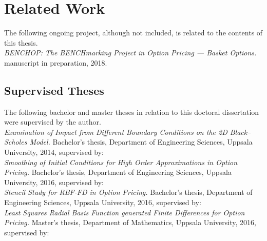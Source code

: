 \documentclass{UUThesisTemplate}
\begin{document}
    




%
\chapter*{Related Work}
    \noindent The following ongoing project, although not included, is related to the contents of this thesis.\\
    
	\noindent {} 
    	\emph{BENCHOP: The BENCHmarking Project in Option Pricing --- Basket Options.}  	  
    	manuscript in preparation, 2018. \label{paper7}	

\section*{Supervised Theses}
The following bachelor and master theses in relation to this doctoral dissertation were supervised by the author.\\
	
	\noindent {} 
    	\emph{Examination of Impact from Different Boundary Conditions on the 2D Black--Scholes Model.}  	  
    	Bachelor's thesis, Department of Engineering Sciences, Uppsala University, 2014,
	supervised by: \\
	
	\noindent {} 
    	\emph{Smoothing of Initial Conditions for High Order Approximations in Option Pricing.}  	  
    	Bachelor's thesis, Department of Engineering Sciences, Uppsala University, 2016,
	supervised by: \\
	
	\noindent {} 
    	\emph{Stencil Study for RBF-FD in Option Pricing.}  	  
    	Bachelor's thesis, Department of Engineering Sciences, Uppsala University, 2016,
	supervised by: \\

	\noindent {} 
    	\emph{Least Squares Radial Basis Function generated Finite Differences for Option Pricing.}  	  
    	Master's thesis, Department of Mathematics, Uppsala University, 2016,
	supervised by: \\	
\end{document}
